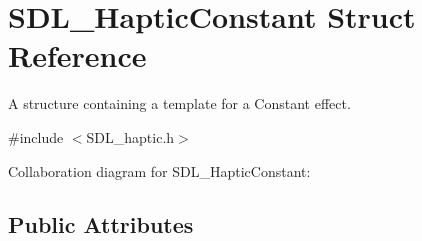 \hypertarget{struct_s_d_l___haptic_constant}{\section{S\-D\-L\-\_\-\-Haptic\-Constant Struct Reference}
\label{struct_s_d_l___haptic_constant}
}


A structure containing a template for a Constant effect.  




{\ttfamily \#include $<$S\-D\-L\-\_\-haptic.\-h$>$}



Collaboration diagram for S\-D\-L\-\_\-\-Haptic\-Constant\-:
\subsection*{Public Attributes}
